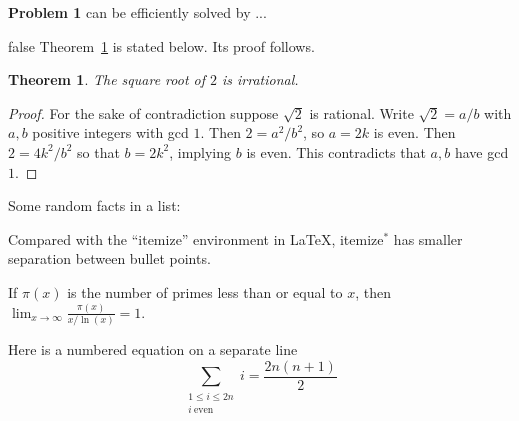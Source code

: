 \documentclass[10pt]{article}
\newenvironment{itemize*}%
  {\vspace{-2ex} \begin{itemize} %
     \setlength{\itemsep}{-1ex} \setlength{\parsep}{0pt}}%
  {\end{itemize}}
\newtheorem{theorem}{Theorem}
\begin{document}


\noindent \textbf{Problem 1} can be efficiently solved by ...


\vspace{1in}







\if false
Theorem~\ref{th:root} is stated below. Its proof follows.

\begin{theorem}
	The square root of $2$ is irrational.
	\label{th:root}
\end{theorem}

\begin{proof}
For the sake of contradiction suppose $\sqrt{2}$ is rational. Write $\sqrt{2} = a/b$ with $a,b$ positive integers with gcd $1$. Then $2 = a^2/b^2$, so $a = 2k$ is even. Then $2 = 4k^2/b^2$ so that $b = 2k^2$, implying $b$ is even. This contradicts that $a,b$ have gcd $1$.
\end{proof}

Some random facts in a list:

\begin{itemize*}
	\item Compared with the ``itemize'' environment in \LaTeX, itemize$^*$ has smaller separation between bullet points.
	\item If $\pi(x)$ is the number of primes less than or equal to $x$, then
$\lim_{x\rightarrow\infty} \frac{\pi(x)}{x/\ln(x)} = 1$.
	\item Here is a numbered equation on a separate line 
	\begin{equation}
		\sum_{\substack{1\le i\le 2n\\i\ \mathrm{even}}} i = \frac{2n(n+1)}2
	\end{equation}
\end{itemize*}
\fi
\end{document}
